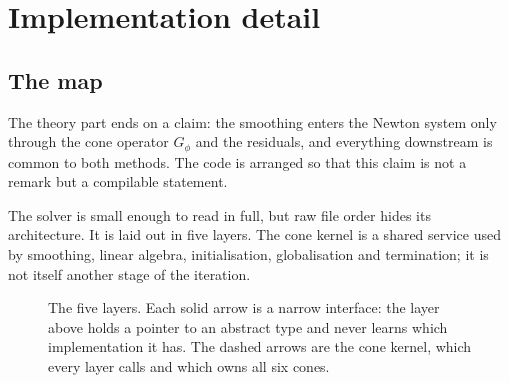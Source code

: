 \documentclass[a4paper,11pt]{book}
\theoremstyle{plain}
\theoremstyle{definition}
\theoremstyle{remark}
\numberwithin{equation}{chapter}
\numberwithin{algorithm}{chapter}
\newcommand{\proj}[2]{\Pi_{#2}\!\left(#1\right)}
\begin{document}
	
	
	
	\part{Implementation detail}

	\chapter{The map}

	The theory part ends on a claim: the smoothing enters the Newton system only
	through the cone operator $G_\phi$ and the residuals, and everything
	downstream is common to both methods. The code is arranged so that this claim
	is not a remark but a compilable statement.

	The solver is small enough to read in full, but raw file order hides its
	architecture. It is laid out in five layers. The cone kernel is a shared
	service used by smoothing, linear algebra, initialisation, globalisation and
	termination; it is not itself another stage of the iteration.

	\begin{figure}[H]
		\centering
		\caption{The five layers. Each solid arrow is a narrow interface: the layer
			above holds a pointer to an abstract type and never learns which
			implementation it has. The dashed arrows are the cone kernel, which every
			layer calls and which owns all six cones.}
	\end{figure}
\end{document}
